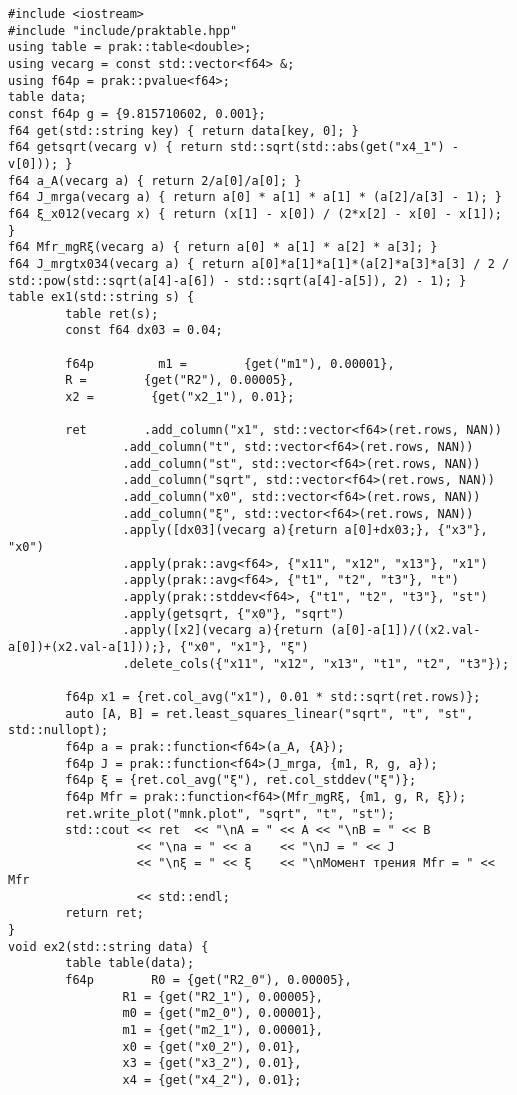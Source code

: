 \documentclass{article}
\begin{document}
\begin{verbatim}
#include <iostream>
#include "include/praktable.hpp"
using table = prak::table<double>;
using vecarg = const std::vector<f64> &;
using f64p = prak::pvalue<f64>;
table data;
const f64p g = {9.815710602, 0.001};
f64 get(std::string key) { return data[key, 0]; }
f64 getsqrt(vecarg v) { return std::sqrt(std::abs(get("x4_1") - v[0])); }
f64 a_A(vecarg a) { return 2/a[0]/a[0]; }
f64 J_mrga(vecarg a) { return a[0] * a[1] * a[1] * (a[2]/a[3] - 1); }
f64 ξ_x012(vecarg x) { return (x[1] - x[0]) / (2*x[2] - x[0] - x[1]); }
f64 Mfr_mgRξ(vecarg a) { return a[0] * a[1] * a[2] * a[3]; }
f64 J_mrgtx034(vecarg a) { return a[0]*a[1]*a[1]*(a[2]*a[3]*a[3] / 2 / std::pow(std::sqrt(a[4]-a[6]) - std::sqrt(a[4]-a[5]), 2) - 1); }
table ex1(std::string s) {
        table ret(s);
        const f64 dx03 = 0.04;

        f64p         m1 =        {get("m1"), 0.00001},
        R =        {get("R2"), 0.00005},
        x2 =        {get("x2_1"), 0.01};

        ret        .add_column("x1", std::vector<f64>(ret.rows, NAN))
                .add_column("t", std::vector<f64>(ret.rows, NAN))
                .add_column("st", std::vector<f64>(ret.rows, NAN))
                .add_column("sqrt", std::vector<f64>(ret.rows, NAN))
                .add_column("x0", std::vector<f64>(ret.rows, NAN))
                .add_column("ξ", std::vector<f64>(ret.rows, NAN))
                .apply([dx03](vecarg a){return a[0]+dx03;}, {"x3"}, "x0")
                .apply(prak::avg<f64>, {"x11", "x12", "x13"}, "x1")
                .apply(prak::avg<f64>, {"t1", "t2", "t3"}, "t")
                .apply(prak::stddev<f64>, {"t1", "t2", "t3"}, "st")
                .apply(getsqrt, {"x0"}, "sqrt")
                .apply([x2](vecarg a){return (a[0]-a[1])/((x2.val-a[0])+(x2.val-a[1]));}, {"x0", "x1"}, "ξ")
                .delete_cols({"x11", "x12", "x13", "t1", "t2", "t3"});

        f64p x1 = {ret.col_avg("x1"), 0.01 * std::sqrt(ret.rows)};
        auto [A, B] = ret.least_squares_linear("sqrt", "t", "st", std::nullopt);
        f64p a = prak::function<f64>(a_A, {A});
        f64p J = prak::function<f64>(J_mrga, {m1, R, g, a});
        f64p ξ = {ret.col_avg("ξ"), ret.col_stddev("ξ")};
        f64p Mfr = prak::function<f64>(Mfr_mgRξ, {m1, g, R, ξ});
        ret.write_plot("mnk.plot", "sqrt", "t", "st");
        std::cout << ret  << "\nA = " << A << "\nB = " << B
                  << "\na = " << a    << "\nJ = " << J
                  << "\nξ = " << ξ    << "\nМомент трения Mfr = " << Mfr 
                  << std::endl;
        return ret;
}
void ex2(std::string data) {
        table table(data);
        f64p        R0 = {get("R2_0"), 0.00005},
                R1 = {get("R2_1"), 0.00005},
                m0 = {get("m2_0"), 0.00001},
                m1 = {get("m2_1"), 0.00001},
                x0 = {get("x0_2"), 0.01},
                x3 = {get("x3_2"), 0.01},
                x4 = {get("x4_2"), 0.01};


\end{verbatim}
\end{document}

